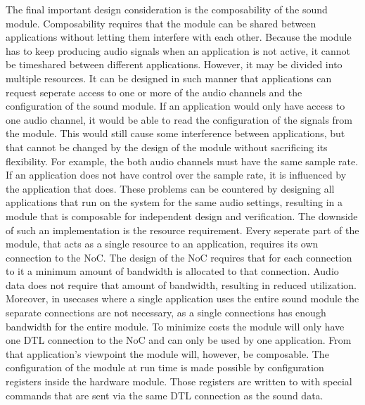 The final important design consideration is the composability of the sound module. Composability requires that the module can be shared between applications without letting them interfere with each other. Because the module has to keep producing audio signals when an application is not active, it cannot be timeshared between different applications. However, it may be divided into multiple resources. It can be designed in such manner that applications can request seperate access to one or more of the audio channels and the configuration of the sound module. If an application would only have access to one audio channel, it would be able to read the configuration of the signals from the module. This would still cause some interference between applications, but that cannot be changed by the design of the module without sacrificing its flexibility. For example, the both audio channels must have the same sample rate. If an application does not have control over the sample rate, it is influenced by the application that does. These problems can be countered by designing all applications that run on the system for the same audio settings, resulting in a module that is composable for independent design and verification. The downside of such an implementation is the resource requirement. Every seperate part of the module, that acts as a single resource to an application, requires its own connection to the NoC. The design of the NoC requires that for each connection to it a minimum amount of bandwidth is allocated to that connection. Audio data does not require that amount of bandwidth, resulting in reduced utilization. Moreover, in usecases where a single application uses the entire sound module the separate connections are not necessary, as a single connections has enough bandwidth for the entire module. To minimize costs the module will only have one DTL connection to the NoC and  can only be used by one application. From that application's viewpoint the module will, however, be composable. The configuration of the module at run time is made possible by configuration registers inside the hardware module. Those registers are written to with special commands that are sent via the same DTL connection as the sound data.

